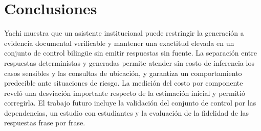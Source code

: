 \documentclass[conference]{IEEEtran}
\begin{document}
\section{Conclusiones}
\label{sec:conclusions}

Yachi muestra que un asistente institucional puede restringir la generación a evidencia documental verificable y mantener una exactitud elevada en un conjunto de control bilingüe sin emitir respuestas sin fuente. La separación entre respuestas deterministas y generadas permite atender sin costo de inferencia los casos sensibles y las consultas de ubicación, y garantiza un comportamiento predecible ante situaciones de riesgo. La medición del costo por componente reveló una desviación importante respecto de la estimación inicial y permitió corregirla. El trabajo futuro incluye la validación del conjunto de control por las dependencias, un estudio con estudiantes y la evaluación de la fidelidad de las respuestas frase por frase.
\end{document}
